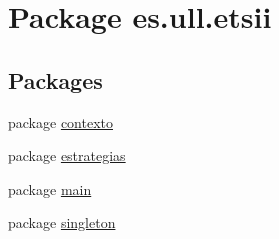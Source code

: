 \hypertarget{namespacees_1_1ull_1_1etsii}{\section{Package es.\-ull.\-etsii}
\label{namespacees_1_1ull_1_1etsii}
}
\subsection*{Packages}
\begin{DoxyCompactItemize}
\item 
package \hyperlink{namespacees_1_1ull_1_1etsii_1_1contexto}{contexto}
\item 
package \hyperlink{namespacees_1_1ull_1_1etsii_1_1estrategias}{estrategias}
\item 
package \hyperlink{namespacees_1_1ull_1_1etsii_1_1main}{main}
\item 
package \hyperlink{namespacees_1_1ull_1_1etsii_1_1singleton}{singleton}
\end{DoxyCompactItemize}

